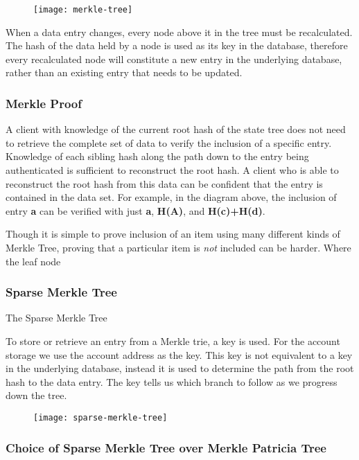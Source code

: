 \begin{figure}[h]
  \centering
\texttt{[image: merkle-tree]}
\end{figure}

When a data entry changes, every node above it in the tree must be recalculated. The hash of the data held by a node is used as its key in the database, therefore every recalculated node will constitute a new entry in the underlying database, rather than an existing entry that needs to be updated.\\

\subsubsection{Merkle Proof}

A client with knowledge of the current root hash of the state tree does not need to retrieve the complete set of data to verify the inclusion of a specific entry. Knowledge of each sibling hash along the path down to the entry being authenticated is sufficient to reconstruct the root hash. A client who is able to reconstruct the root hash from this data can be confident that the entry is contained in the data set. For example, in the diagram above, the inclusion of entry \textbf{a} can be verified with just \textbf{a}, \textbf{H(A)}, and \textbf{H(c)+H(d)}. 

Though it is simple to prove inclusion of an item using many different kinds of Merkle Tree, proving that a particular item is \emph{not} included can be harder. Where the leaf node 

\subsubsection{Sparse Merkle Tree}

The Sparse Merkle Tree

To store or retrieve an entry from a Merkle trie, a key is used. For the account storage we use the account address as the key. This key is not equivalent to a key in the underlying database, instead it is used to determine the path from the root hash to the data entry. The key tells us which branch to follow as we progress down the tree.  

\begin{figure}[h]
  \centering
\texttt{[image: sparse-merkle-tree]}
\end{figure}


\subsubsection{Choice of Sparse Merkle Tree over Merkle Patricia Tree}

